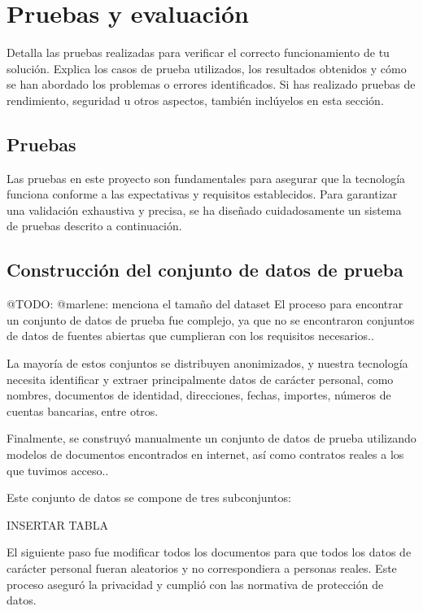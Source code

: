 \section{Pruebas y evaluación}\label{sec:pruebas_y_evaluacion}

Detalla las pruebas realizadas para verificar el correcto funcionamiento de tu solución.
Explica los casos de prueba utilizados, los resultados obtenidos y cómo se han abordado los problemas o errores
identificados.
Si has realizado pruebas de rendimiento, seguridad u otros aspectos, también inclúyelos en esta sección.


\subsection{Pruebas}
Las pruebas en este proyecto son fundamentales para asegurar que la tecnología funciona conforme a las expectativas y
requisitos establecidos. Para garantizar una validación exhaustiva y precisa, se ha diseñado cuidadosamente un sistema
de pruebas descrito a continuación.

\subsection*{Construcción del conjunto de datos de prueba}

\colorbox{color_highlight}{@TODO: @marlene:} menciona el tamaño del dataset
El proceso para encontrar un conjunto de datos de prueba fue complejo, ya que no se encontraron conjuntos de datos de
fuentes abiertas que cumplieran con los requisitos necesarios..

La mayoría de estos conjuntos se distribuyen anonimizados, y nuestra tecnología necesita identificar y extraer
principalmente datos de carácter personal, como nombres, documentos de identidad, direcciones, fechas, importes, números
de cuentas bancarias, entre otros.

Finalmente, se construyó manualmente un conjunto de datos de prueba utilizando modelos de documentos encontrados en
internet, así como contratos reales a los que tuvimos acceso..

Este conjunto de datos se compone de tres subconjuntos:


INSERTAR TABLA

El siguiente paso fue modificar todos los documentos para que todos los datos de carácter personal fueran aleatorios y
no correspondiera a personas reales. Este proceso aseguró la privacidad y cumplió con las normativa de protección de
datos.

